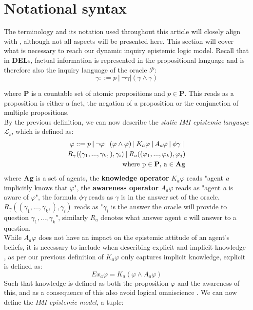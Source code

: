 \section{Notational syntax}
The terminology and its notation used throughout this article will closely
align with \cite{delimi}, although not all aspects will be presented here. This
section will cover what is necessary to reach our dynamic inquiry epistemic
logic model. Recall that in \textbf{DEL}s, factual information is represented
in the propositional language and is therefore also the inquiry language of the
oracle $\mathscr{P}$: $$ \gamma::= p\:|\:\neg\gamma|(\gamma\land\gamma) $$

where \textbf{P} is a countable set of atomic propositions and $p \in
	\mathbf{P}$. This reads as a proposition is either a fact, the negation of a
proposition or the conjunction of multiple propositions.\\ By the previous
definition, we can now describe the \textit{static IMI epistemic language}
$\mathscr{L_s}$, which is defined as:
\begin{align*}
	\varphi ::= p \:|\:\neg\varphi\:|\:(\varphi \land \varphi) \:|\: K_a\varphi \:|\: A_a\varphi \:|\: \phi\gamma \:|\:\\ R_\gamma((\gamma_1,...,\gamma_k,), \gamma_i) \:|\: R_a((\varphi_1,...,\varphi_k), \varphi_j) \\ \text{where p} \in \text{\textbf{P}}\text{, a} \in \text{\textbf{Ag}}
\end{align*}
where \textbf{Ag} is a set of agents, the \textbf{knowledge operator} $K_a\varphi$ reads "agent \textit{a} implicitly knows that $\varphi$", the \textbf{awareness operator} $A_a\varphi$ reads as "agent \textit{a} is aware of $\varphi$", the formula $\phi\gamma$ reads as $\gamma$ is in the answer set of the oracle. $R_\gamma((\gamma_1,...,\gamma_k,), \gamma_i)$ reads as "$\gamma_i$ is the answer the oracle will provide to question $\gamma_1,...,\gamma_k$", similarly $R_a$ denotes what answer agent \textit{a} will answer to a question. \\
While $A_a\varphi$ does not have an impact on the epistemic attitude of an agent's beliefs, it is necessary to include when describing explicit and implicit knowledge \cite{delimi}, as per our previous definition of $K_a\varphi$ only captures implicit knowledge, explicit is defined as:
$$
	Ex_a\varphi = K_a(\varphi \land A_a\varphi)
$$
Such that knowledge is defined as both the proposition $\varphi$ and the awareness of this, and as a consequence of this also avoid logical omniscience \cite{fagin87}\cite{vanbenthem2010}. We can now define the \textit{IMI epistemic model}, a tuple:
